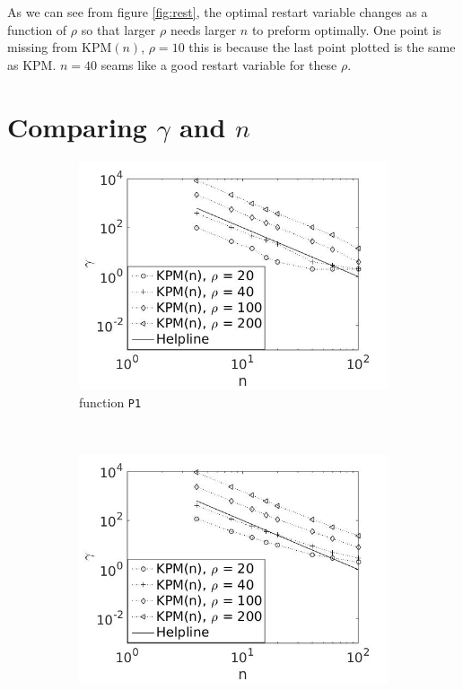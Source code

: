 As we can see from figure \ref{fig:rest}, the optimal restart variable changes as a function of $\rho$ so that larger $\rho$ needs larger $n$ to preform optimally. One point is missing from KPM$(n)$, $\rho = 10$ this is because the last point plotted is the same as KPM. $n = 40$ seams like a good restart variable for these $\rho$.
\section{Comparing $\gamma$ and $n$} \label{sec:rrest}
\begin{figure}[H]
        \centering
        \begin{subfigure}[b]{0.45\textwidth}
                \includegraphics[width=\textwidth]{fig/s3antvsm1}
                \caption{function \texttt{P1}}
                \label{fig:ant1}
        \end{subfigure}%
~
        \begin{subfigure}[b]{0.45\textwidth}
                \includegraphics[width=\textwidth]{fig/s4antvsm2}

\end{subfigure}
\end{figure}
